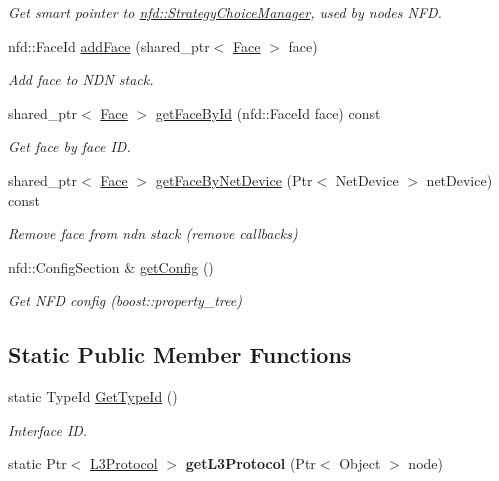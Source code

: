 \begin{DoxyCompactItemize}
\begin{DoxyCompactList}\small\item\em Get smart pointer to \hyperlink{classnfd_1_1StrategyChoiceManager}{nfd\+::\+Strategy\+Choice\+Manager}, used by node\textquotesingle{}s N\+FD. \end{DoxyCompactList}\item 
nfd\+::\+Face\+Id \hyperlink{classns3_1_1ndn_1_1L3Protocol_a24f0ec708616b619f8e263db3eaedca2}{add\+Face} (shared\+\_\+ptr$<$ \hyperlink{classnfd_1_1Face}{Face} $>$ face)
\begin{DoxyCompactList}\small\item\em Add face to N\+DN stack. \end{DoxyCompactList}\item 
shared\+\_\+ptr$<$ \hyperlink{classnfd_1_1Face}{Face} $>$ \hyperlink{classns3_1_1ndn_1_1L3Protocol_a01d318e6840684e6089edd2cbe429570}{get\+Face\+By\+Id} (nfd\+::\+Face\+Id face) const
\begin{DoxyCompactList}\small\item\em Get face by face ID. \end{DoxyCompactList}\item 
shared\+\_\+ptr$<$ \hyperlink{classnfd_1_1Face}{Face} $>$ \hyperlink{classns3_1_1ndn_1_1L3Protocol_a42cf6b110df4c620a3fb46b0be23decb}{get\+Face\+By\+Net\+Device} (Ptr$<$ Net\+Device $>$ net\+Device) const
\begin{DoxyCompactList}\small\item\em Remove face from ndn stack (remove callbacks) \end{DoxyCompactList}\item 
nfd\+::\+Config\+Section \& \hyperlink{classns3_1_1ndn_1_1L3Protocol_a9e22fc46fedaf271f0f28238075c9857}{get\+Config} ()\hypertarget{classns3_1_1ndn_1_1L3Protocol_a9e22fc46fedaf271f0f28238075c9857}{}\label{classns3_1_1ndn_1_1L3Protocol_a9e22fc46fedaf271f0f28238075c9857}

\begin{DoxyCompactList}\small\item\em Get N\+FD config (boost\+::property\+\_\+tree) \end{DoxyCompactList}\end{DoxyCompactItemize}
\subsection*{Static Public Member Functions}
\begin{DoxyCompactItemize}
\item 
static Type\+Id \hyperlink{classns3_1_1ndn_1_1L3Protocol_a63a73159fe984d369b1ef794e5b271ea}{Get\+Type\+Id} ()
\begin{DoxyCompactList}\small\item\em Interface ID. \end{DoxyCompactList}\item 
static Ptr$<$ \hyperlink{classns3_1_1ndn_1_1L3Protocol}{L3\+Protocol} $>$ {\bfseries get\+L3\+Protocol} (Ptr$<$ Object $>$ node)\hypertarget{classns3_1_1ndn_1_1L3Protocol_a41b587333a8c4120d55c36ce3e1adcd8}{}\label{classns3_1_1ndn_1_1L3Protocol_a41b587333a8c4120d55c36ce3e1adcd8}

\end{DoxyCompactItemize}
